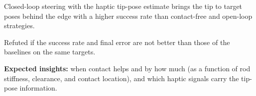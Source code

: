 \begin{hypothesis}\label{hyp:steer}
Closed-loop steering with the haptic tip-pose estimate brings the tip to
target poses behind the edge with a higher success rate than contact-free and
open-loop strategies.
\end{hypothesis}
\begin{outline}
  \item Refuted if the success rate and final error are not better than those
    of the baselines on the same targets.
\end{outline}

\begin{outline}
  \item \textbf{Expected insights:} when contact helps and by how much (as a
    function of rod stiffness, clearance, and contact location), and which
    haptic signals carry the tip-pose information.
\end{outline}
